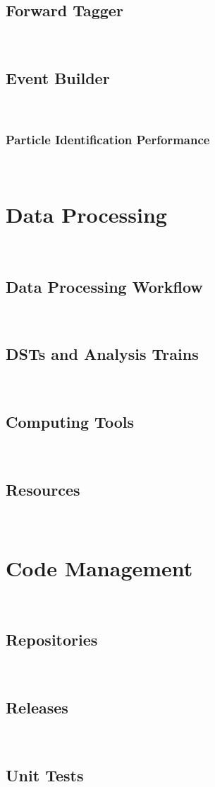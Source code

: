 \documentclass{elsart}
\begin{document}
\subsection{Forward Tagger}
~~

\subsection{Event Builder}
~~

\subsubsection{Particle Identification Performance}
~~

\section{Data Processing}
~~

\subsection{Data Processing Workflow}
~~

\subsection{DSTs and Analysis Trains}
~~

\subsection{Computing Tools}
~~

\subsection{Resources}
~~

\section{Code Management}
~~

\subsection{Repositories}
~~

\subsection{Releases}
~~

\subsection{Unit Tests}
~~
\end{document}
